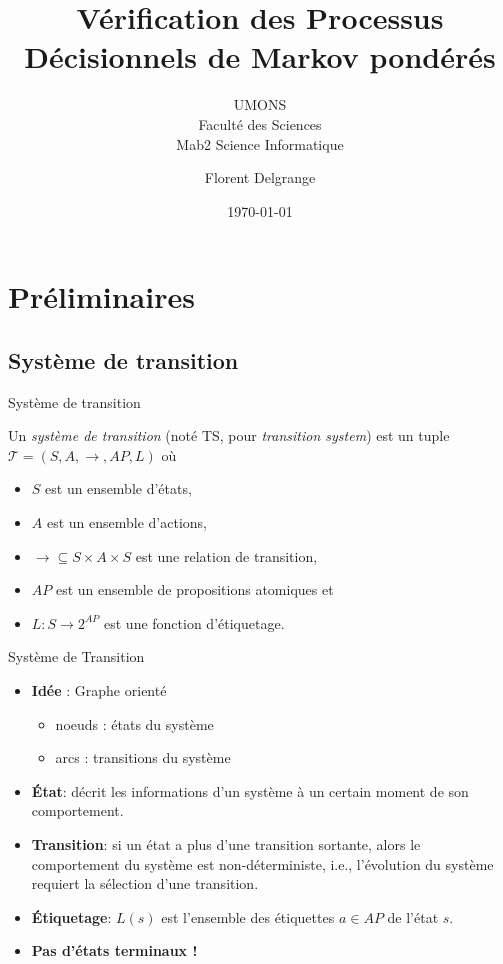 \documentclass[compress]{beamer}
\title{Vérification des Processus Décisionnels de Markov pondérés
} %
\author{Florent Delgrange}
\subtitle{\normalsize UMONS \\ Faculté des Sciences \\ Mab2 Science Informatique}
\date{\today}
\begin{document}
  \begin{frame}[plain]
    \maketitle
  \end{frame}


\section{Préliminaires}
\subsection{Système de transition}
\begin{frame}{Système de transition}
\begin{definition}
Un \textit{système de transition} (noté TS, pour \textit{transition system}) est un tuple $\mathcal{T} = (S, A, \rightarrow, AP, L)$ où
\begin{itemize}
  \item $S$ est un ensemble d'états,
  \item $A$ est un ensemble d'actions,
  \item $\rightarrow \subseteq S \times A \times S$ est une relation de transition,
  \item $AP$ est un ensemble de propositions atomiques et
  \item $L: S \rightarrow 2^{AP}$ est une fonction d'étiquetage.
\end{itemize}
\end{definition}
\end{frame}

\begin{frame}{Système de Transition}
  \begin{itemize}
    \item \textbf{\color{fibeamer@orange}Idée} : Graphe orienté
      \begin{itemize}
        \item noeuds : états du système
        \item arcs : transitions du système
      \end{itemize}
    \item \textbf{\color{fibeamer@orange}\'Etat}: décrit les informations d'un système à un certain moment de son comportement.
    \item \textbf{\color{fibeamer@orange}Transition}: si un état a plus d'une transition sortante, alors le comportement du système est \alert {non-déterministe}, i.e., l'évolution du système requiert la sélection d'une transition.
    \item \textbf{\color{fibeamer@orange}\'Etiquetage}: $L(s)$ est l'ensemble des étiquettes $a \in AP$ de l'état $s$.
    \item \textbf{\color{fibeamer@orange}Pas d'états terminaux !}
  \end{itemize}
\end{frame}
\end{document}
